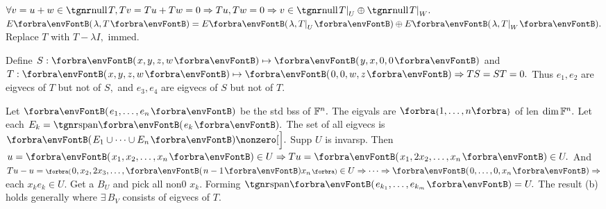 
\vspace{4pt}


$\forall v=u+w\in\null T, Tv=Tu+Tw=0\Rightarrow Tu,Tw=0\Rightarrow v\in\null T\mmid_U\oplus\null T\mmid_W.$\PfEnd
\ACoro $E\Par{\lambda,T}=E\Par{\lambda,T\mmid_U}\oplus E\Par{\lambda,T\mmid_W}.$ Replace $T$ with $T-\lambda I,$ immed.
\SepLine

\SepLine

Define $S:\Par{x,y,z,w}\mapsto\Par{y,x,0,0}$ and $T:\Par{x,y,z,w}\mapsto\Par{0,0,w,z}\Rightarrow TS=ST=0.$\parSol{}
Thus ${e_1,e_2}$ are eigvecs of $T$ but not of $S,$ and ${e_3,e_4}$ are eigvecs of $S$ but not of $T.$
\SepLine


Let $\Par{e_1,\dots,e_n}$ be the std bss of ${\mathbb{F}}^n.$ The eigvals are $\Bra{1,\dots,n}$ of len $\dim{\mathbb{F}}^n.$\parSol{}
Let each $E_k=\Span{e_k}.$ The set of all eigvecs is $\Par{E_1\cup\cdots\cup E_n}\nonzero[\Big].$\parSol{}
Supp $U$ is invarsp. Then $u=\Par{x_1,x_2,\dots,x_n}\in U\Rightarrow Tu=\Par{x_1,2x_2,\dots,x_n}\in U.$\parSol{}
And $Tu-u=\BigPar{0,x_2,2x_3,\dots,\Par{n-1}x_n}\in U\Rightarrow\cdots\Rightarrow\Par{0,\dots,0,x_n}\Rightarrow$ each $x_ke_k\in U.$\parSol{}
Get a $B_U$ and pick all non0 $x_k.$ Forming $\Span{e_{k_1},\dots,e_{k_m}}=U.$\PfEnd\vspace{2pt}
\AComm The result (b) holds generally where $\exists\,B_V$ consists of eigvecs of $T.$
\SepLine

